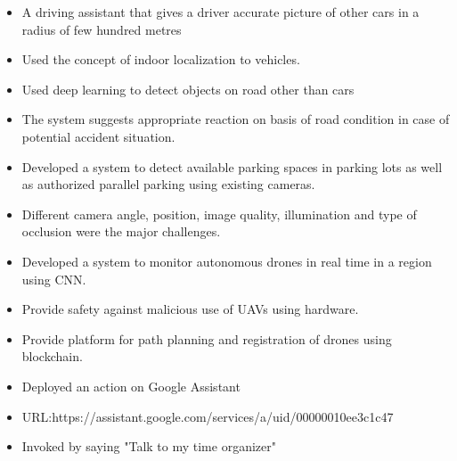 \begin{itemize}
\item A driving assistant that gives a driver accurate picture of other cars in a radius of few hundred metres
\item Used the concept of indoor localization to \newline vehicles.
\item Used deep learning to detect objects on road other than cars
\item The system suggests appropriate reaction on basis of road condition in case of potential \newline accident situation.
\end{itemize}


\smallskip
\smallskip


\begin{itemize}
\item Developed a system to detect available parking spaces in parking lots as well as authorized parallel parking using existing cameras.
\item Different camera angle, position, image quality, illumination and type of occlusion were the major challenges.
\end{itemize}

\smallskip
\smallskip

\begin{itemize}
\item Developed a system to monitor autonomous drones in real time in a region using CNN.
\item Provide safety against malicious use of UAVs using hardware.
\item Provide platform for path planning and registration of drones using blockchain. 
\end{itemize}

\begin{itemize}
\item Deployed an action on Google Assistant
\item URL:https://assistant.google.com/services\newline/a/uid/00000010ee3c1c47
\item Invoked by saying "Talk to my time organizer"
\end{itemize}



\cvproject{}